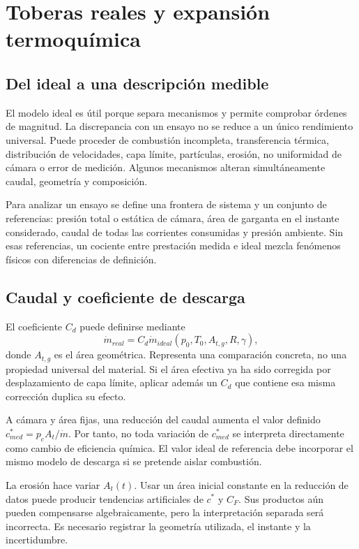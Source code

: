 \chapter{Toberas reales y expansión termoquímica}\label{ch:09}
\section{Del ideal a una descripción medible}
El modelo ideal es útil porque separa mecanismos y permite comprobar órdenes de magnitud. La discrepancia con un ensayo no se reduce a un único rendimiento universal. Puede proceder de combustión incompleta, transferencia térmica, distribución de velocidades, capa límite, partículas, erosión, no uniformidad de cámara o error de medición. Algunos mecanismos alteran simultáneamente caudal, geometría y composición.

Para analizar un ensayo se define una frontera de sistema y un conjunto de referencias: presión total o estática de cámara, área de garganta en el instante considerado, caudal de todas las corrientes consumidas y presión ambiente. Sin esas referencias, un cociente entre prestación medida e ideal mezcla fenómenos físicos con diferencias de definición.
\section{Caudal y coeficiente de descarga}
El coeficiente $C_d$ puede definirse mediante
\[
 \dot m_{real}=C_d\dot m_{ideal}(p_0,T_0,A_{t,g},R,\gamma),
\]
donde $A_{t,g}$ es el área geométrica. Representa una comparación concreta, no una propiedad universal del material. Si el área efectiva ya ha sido corregida por desplazamiento de capa límite, aplicar además un $C_d$ que contiene esa misma corrección duplica su efecto.

A cámara y área fijas, una reducción del caudal aumenta el valor definido $c^*_{med}=p_cA_t/\dot m$. Por tanto, no toda variación de $c^*_{med}$ se interpreta directamente como cambio de eficiencia química. El valor ideal de referencia debe incorporar el mismo modelo de descarga si se pretende aislar combustión.

La erosión hace variar $A_t(t)$. Usar un área inicial constante en la reducción de datos puede producir tendencias artificiales de $c^*$ y $C_F$. Sus productos aún pueden compensarse algebraicamente, pero la interpretación separada será incorrecta. Es necesario registrar la geometría utilizada, el instante y la incertidumbre.
